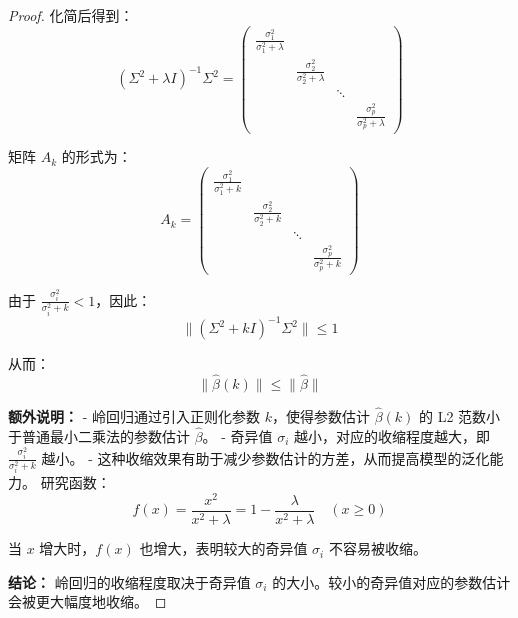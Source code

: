 \documentclass[lang=cn,11pt,a4paper]{elegantpaper}
\begin{document}
\begin{proof}
            化简后得到：
            \begin{equation}
            (\Sigma^2 + \lambda I)^{-1} \Sigma^2 = \begin{pmatrix}
            \frac{\sigma_1^2}{\sigma_1^2 + \lambda} & & & \\
            & \frac{\sigma_2^2}{\sigma_2^2 + \lambda} & & \\
            & & \ddots & \\
            & & & \frac{\sigma_p^2}{\sigma_p^2 + \lambda}
            \end{pmatrix}
            \end{equation}
        
        矩阵 \( A_k \) 的形式为：
        \begin{equation}
        A_k = \begin{pmatrix}
        \frac{\sigma_1^2}{\sigma_1^2 + k} & & & \\
        & \frac{\sigma_2^2}{\sigma_2^2 + k} & & \\
        & & \ddots & \\
        & & & \frac{\sigma_p^2}{\sigma_p^2 + k}
        \end{pmatrix}
        \end{equation}
        
        由于 \(\frac{\sigma_i^2}{\sigma_i^2 + k} < 1\)，因此：
        \begin{equation}
        \| (\Sigma^2 + k I)^{-1} \Sigma^2 \| \leq 1
        \end{equation}
        
        从而：
        \begin{equation}
        \| \hat{\beta}(k) \| \leq \| \hat{\beta} \|
        \end{equation}
        
        \textbf{额外说明：}
        - 岭回归通过引入正则化参数 \( k \)，使得参数估计 \(\hat{\beta}(k)\) 的 L2 范数小于普通最小二乘法的参数估计 \(\hat{\beta}\)。
        - 奇异值 \(\sigma_i\) 越小，对应的收缩程度越大，即 \(\frac{\sigma_i^2}{\sigma_i^2 + k}\) 越小。
        - 这种收缩效果有助于减少参数估计的方差，从而提高模型的泛化能力。
\newline
        研究函数：
        \begin{equation}
        f(x) = \frac{x^2}{x^2 + \lambda} = 1 - \frac{\lambda}{x^2 + \lambda} \quad (x \geq 0)
        \end{equation}
        
        当 \( x \) 增大时，\( f(x) \) 也增大，表明较大的奇异值 \(\sigma_i\) 不容易被收缩。
        
        \textbf{结论：}
        岭回归的收缩程度取决于奇异值 \(\sigma_i\) 的大小。较小的奇异值对应的参数估计会被更大幅度地收缩。
    \end{proof}
\end{document}
